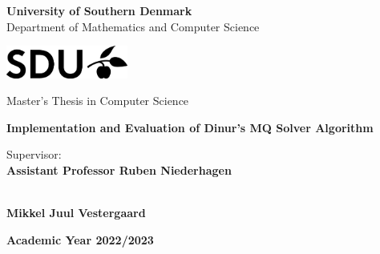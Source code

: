 \begin{center}
{\LARGE \textbf{University of Southern Denmark}} \\
\vspace{0.2cm}
{\Large {Department of Mathematics and Computer Science}} \\ 
\vspace{1cm}

\includegraphics[width=4cm]{figures/SDU-no-title.png} \\
\vspace{1cm}

{\Large {Master's Thesis in Computer Science}} \\
\vspace{6cm}

{\LARGE \textbf{Implementation and Evaluation of Dinur's MQ Solver Algorithm}} \\ 
\vspace{1cm}

\end{center}

\begin{multicols}{2}
\noindent \large{Supervisor:} \\
\large{\textbf{Assistant Professor Ruben Niederhagen}} \\
\columnbreak

 \\
\large{\textbf{Mikkel Juul Vestergaard}} \\
\end{multicols}
\vspace{4cm}

\begin{center}
    \large{\textbf{Academic Year 2022/2023}}
\end{center}


